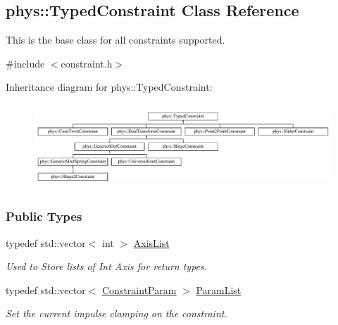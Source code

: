 \hypertarget{classphys_1_1TypedConstraint}{
\subsection{phys::TypedConstraint Class Reference}
\label{classphys_1_1TypedConstraint}
}


This is the base class for all constraints supported.  




{\ttfamily \#include $<$constraint.h$>$}

Inheritance diagram for phys::TypedConstraint:\begin{figure}[H]
\begin{center}
\leavevmode
\includegraphics[height=3.196347cm]{classphys_1_1TypedConstraint}
\end{center}
\end{figure}
\subsubsection*{Public Types}
\begin{DoxyCompactItemize}
\item 
typedef std::vector$<$ int $>$ \hyperlink{classphys_1_1TypedConstraint_a26261a4055e84e104c58d84eea5667c2}{AxisList}
\begin{DoxyCompactList}\small\item\em Used to Store lists of Int Axis for return types. \item\end{DoxyCompactList}\item 
typedef std::vector$<$ \hyperlink{namespacephys_aa1e7cf2d7efcaeaeac304f711e7564e8}{ConstraintParam} $>$ \hyperlink{classphys_1_1TypedConstraint_a4c2dcea3fbb764e454840329126d034e}{ParamList}
\begin{DoxyCompactList}\small\item\em Set the current impulse clamping on the constraint. \item\end{DoxyCompactList}\end{DoxyCompactItemize}
